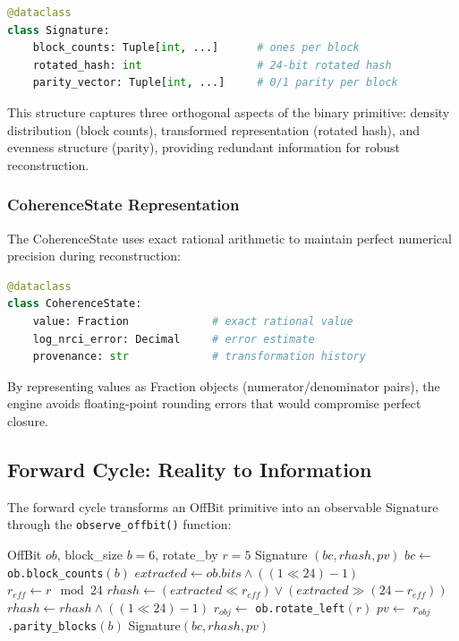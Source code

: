 \documentclass[11pt,letterpaper]{article}
\begin{document}
\begin{lstlisting}[language=Python]
@dataclass
class Signature:
    block_counts: Tuple[int, ...]      # ones per block
    rotated_hash: int                  # 24-bit rotated hash
    parity_vector: Tuple[int, ...]     # 0/1 parity per block
\end{lstlisting}

This structure captures three orthogonal aspects of the binary primitive: density distribution (block counts), transformed representation (rotated hash), and evenness structure (parity), providing redundant information for robust reconstruction.

\subsubsection{CoherenceState Representation}

The CoherenceState uses exact rational arithmetic to maintain perfect numerical precision during reconstruction:

\begin{lstlisting}[language=Python]
@dataclass
class CoherenceState:
    value: Fraction             # exact rational value
    log_nrci_error: Decimal     # error estimate
    provenance: str             # transformation history
\end{lstlisting}

By representing values as Fraction objects (numerator/denominator pairs), the engine avoids floating-point rounding errors that would compromise perfect closure.

\subsection{Forward Cycle: Reality to Information}
\label{subsec:forward}

The forward cycle transforms an OffBit primitive into an observable Signature through the \texttt{observe\_offbit()} function:

\begin{algorithm}[H]
\caption{Forward Cycle: \texttt{observe\_offbit()}}
\begin{algorithmic}[1]
\REQUIRE OffBit $ob$, block\_size $b=6$, rotate\_by $r=5$
\ENSURE Signature $(bc, rhash, pv)$
\STATE $bc \leftarrow$ \texttt{ob.block\_counts}$(b)$ 
\STATE $extracted \leftarrow ob.bits \land ((1 \ll 24) - 1)$ 
\STATE $r_{eff} \leftarrow r \mod 24$ 
\STATE $rhash \leftarrow (extracted \ll r_{eff}) \lor (extracted \gg (24 - r_{eff}))$ 
\STATE $rhash \leftarrow rhash \land ((1 \ll 24) - 1)$ 
\STATE $r_{obj} \leftarrow$ \texttt{ob.rotate\_left}$(r)$ 
\STATE $pv \leftarrow$ \texttt{$r_{obj}$.parity\_blocks}$(b)$ 
\RETURN Signature$(bc, rhash, pv)$
\end{algorithmic}
\end{algorithm}
\end{document}
